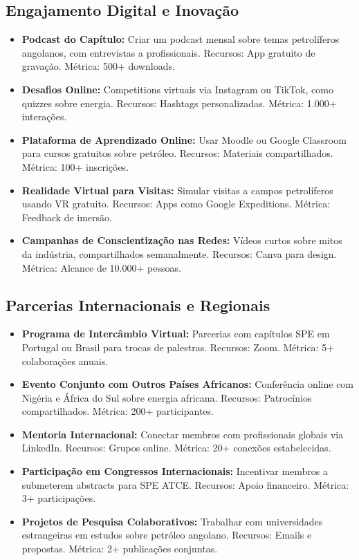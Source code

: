 \documentclass[12pt]{article}
\begin{document}
\subsection{Engajamento Digital e Inovação}
\begin{itemize}
    \item \textbf{Podcast do Capítulo:} Criar um podcast mensal sobre temas petrolíferos angolanos, com entrevistas a profissionais. Recursos: App gratuito de gravação. Métrica: 500+ downloads.
    \item \textbf{Desafios Online:} Competitions virtuais via Instagram ou TikTok, como quizzes sobre energia. Recursos: Hashtags personalizadas. Métrica: 1.000+ interações.
    \item \textbf{Plataforma de Aprendizado Online:} Usar Moodle ou Google Classroom para cursos gratuitos sobre petróleo. Recursos: Materiais compartilhados. Métrica: 100+ inscrições.
    \item \textbf{Realidade Virtual para Visitas:} Simular visitas a campos petrolíferos usando VR gratuito. Recursos: Apps como Google Expeditions. Métrica: Feedback de imersão.
    \item \textbf{Campanhas de Conscientização nas Redes:} Vídeos curtos sobre mitos da indústria, compartilhados semanalmente. Recursos: Canva para design. Métrica: Alcance de 10.000+ pessoas.
\end{itemize}

\subsection{Parcerias Internacionais e Regionais}
\begin{itemize}
    \item \textbf{Programa de Intercâmbio Virtual:} Parcerias com capítulos SPE em Portugal ou Brasil para trocas de palestras. Recursos: Zoom. Métrica: 5+ colaborações anuais.
    \item \textbf{Evento Conjunto com Outros Países Africanos:} Conferência online com Nigéria e África do Sul sobre energia africana. Recursos: Patrocínios compartilhados. Métrica: 200+ participantes.
    \item \textbf{Mentoria Internacional:} Conectar membros com profissionais globais via LinkedIn. Recursos: Grupos online. Métrica: 20+ conexões estabelecidas.
    \item \textbf{Participação em Congressos Internacionais:} Incentivar membros a submeterem abstracts para SPE ATCE. Recursos: Apoio financeiro. Métrica: 3+ participações.
    \item \textbf{Projetos de Pesquisa Colaborativos:} Trabalhar com universidades estrangeiras em estudos sobre petróleo angolano. Recursos: Emails e propostas. Métrica: 2+ publicações conjuntas.
\end{itemize}
\end{document}
